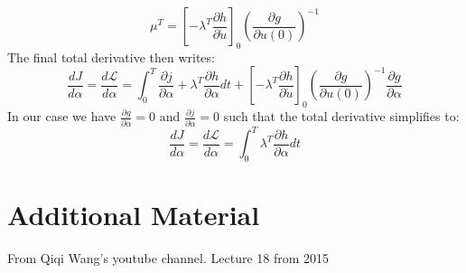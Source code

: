\documentclass[10pt]{article}
\begin{document}
\begin{equation}
\mu^T = \left[- \lambda^T \frac{\partial h}{\partial\dot u} \right]_0 \left( \frac{\partial g}{\partial u(0)}\right)^{-1}
\end{equation}
The final total derivative then writes:
\begin{equation}
\frac{dJ}{d \alpha} =  \frac{d\mathcal{L}}{d \alpha} = \int_{0}^{T}\frac{\partial j}{\partial \alpha} + \lambda^T \frac{\partial h}{\partial \alpha} dt + \left[- \lambda^T \frac{\partial h}{\partial\dot u} \right]_0 \left( \frac{\partial g}{\partial u(0)}\right)^{-1} \frac{\partial g}{\partial\alpha}
\end{equation}
In our case we have $\frac{\partial g}{\partial\alpha}=0$ and $\frac{\partial j}{\partial \alpha}=0$ such that the total derivative simplifies to:
\begin{equation}
\frac{dJ}{d \alpha} =  \frac{d\mathcal{L}}{d \alpha} = \int_{0}^{T} \lambda^T \frac{\partial h}{\partial \alpha} dt
\end{equation}

\newpage
\section{Additional Material}
From Qiqi Wang's youtube channel. Lecture 18 from 2015
\end{document}
